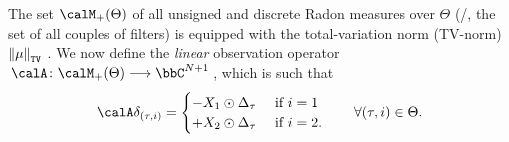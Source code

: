 \mynewline
The set $\posDisRadonMeasure$ of all unsigned and discrete Radon measures over $\Theta$ (\ie/, the set of all couples of  filters) is equipped with the total-variation norm (TV-norm) $\normTV{\mu}$
.
We now define the \emph{linear} observation operator $\kfuncdef{\opObs}{\posDisRadonMeasure}{\bbC^{N+1}}$, which is such that
\begin{equation}
    \opObs\delta_{(\tau, i)}
    =
    \begin{cases}
        - \RecordedSignalDFT_1 \odot \paramVec{\tau}  &\text{ if } i=1 \\
        + \RecordedSignalDFT_2 \odot \paramVec{\tau}  &\text{ if } i=2.
    \end{cases}
    \qquad \forall(\tau,i)\in\Theta.
\end{equation}

